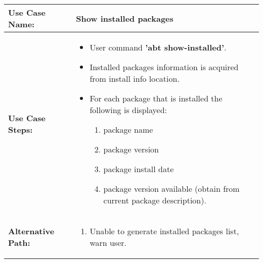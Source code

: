 \medskip

\begin{tabularx}{\linewidth}{|l|X|}
\hline
\textbf{Use Case Name:} & \textbf{Show installed packages} \\
\hline
\textbf{Use Case Steps:} & 
\begin{minipage}{\linewidth} 
  \vspace{0.05em}
  \begin{itemize}
    \item User command \textbf{'abt show-installed'}.
    \item Installed packages information is acquired from install info location.
    \item For each package that is installed the following is displayed:
    \begin{enumerate}
      \item package name
      \item package version
      \item package install date
      \item package version available (obtain from current package description).
    \end{enumerate}
  \end{itemize}
  \vspace{0.05em}
\end{minipage}
\\
\hline 
\textbf{Alternative Path:} &
\begin{minipage}{\linewidth}
  \vspace{0.05em} 
  \begin{enumerate}
    \item Unable to generate installed packages list, warn user.
  \end{enumerate}
  \vspace{0.05em} 
\end{minipage}
\\
\hline
\end{tabularx}